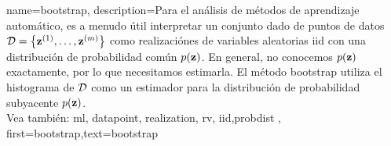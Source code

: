 {name={bootstrap},
	description={Para el análisis de métodos de aprendizaje automático, es a menudo útil interpretar 
		un conjunto dado de puntos de datos $\mathcal{D} = \big\{ {\bf z}^{(1)},\ldots,{\bf z}^{(m)}\big\}$ 
		como realizaciónes de variables aleatorias iid con una distribución de probabilidad común $p({\bf z})$. En general, no conocemos 
		$p({\bf z})$ exactamente, por lo que necesitamos estimarla. El método bootstrap utiliza el histograma de 
		$\mathcal{D}$ como un estimador para la distribución de probabilidad subyacente $p({\bf z})$. 
		\\
		Vea también: \gls{ml}, \gls{datapoint}, \gls{realization}, \gls{rv}, \gls{iid},\gls{probdist} },
	first={bootstrap},text={bootstrap}  
}


